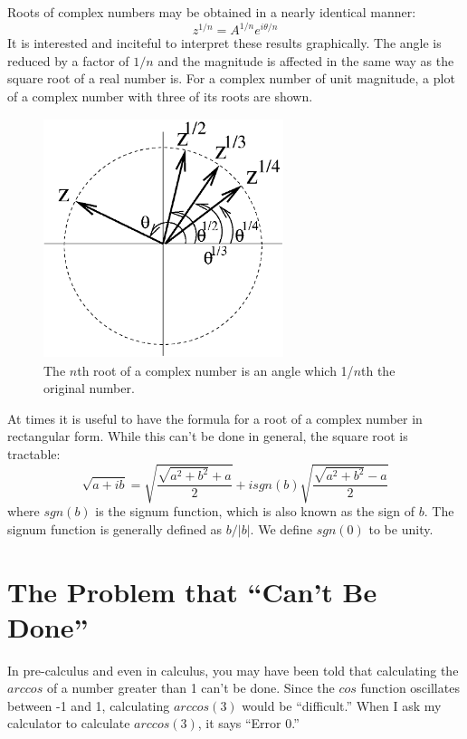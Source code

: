 Roots of complex numbers may be obtained in a nearly
identical manner:
\begin{equation}
z^{1/n} = A^{1/n} e^{i\theta /n}
\end{equation}
It is interested and inciteful to interpret these
results graphically.  The angle is reduced by a factor
of $1/n$ and the magnitude is affected in the same way
as the square root of a real number is.  For a complex
number of unit magnitude, a plot of a complex number
with three of its roots are shown.
\begin{figure}
\begin{center}
\includegraphics[width=7cm,height=7cm]{images/root.eps}
\caption[Roots of Complex numbers]{The $n$th root of a
complex number is an angle which 1/$n$th the original number.}
\end{center}
\end{figure}
At times it is useful to have the formula for a root of a complex 
number in rectangular form. While this can't be done in general, 
the square root is tractable:
\begin{equation}
\sqrt{a+ib} = 
\sqrt{\frac{\sqrt{a^2 + b^2} +a}{2}} +isgn(b)
\sqrt{\frac{\sqrt{a^2 + b^2} -a}{2}}
\end{equation}
where $sgn(b)$ is the signum function, which is also known
as the sign of $b$.  The signum function is generally 
defined as $b/|b|$.  We define $sgn(0)$ to be unity.

\section{The Problem that ``Can't Be Done''}
In pre-calculus and even in calculus, you may have been told
that calculating the $arccos$ of a number greater than 1
can't be done.  Since the $cos$ function oscillates between
-1 and 1, calculating $arccos(3)$ would be ``difficult.''
When I ask my calculator to calculate $arccos(3)$, it says
``Error 0.''

